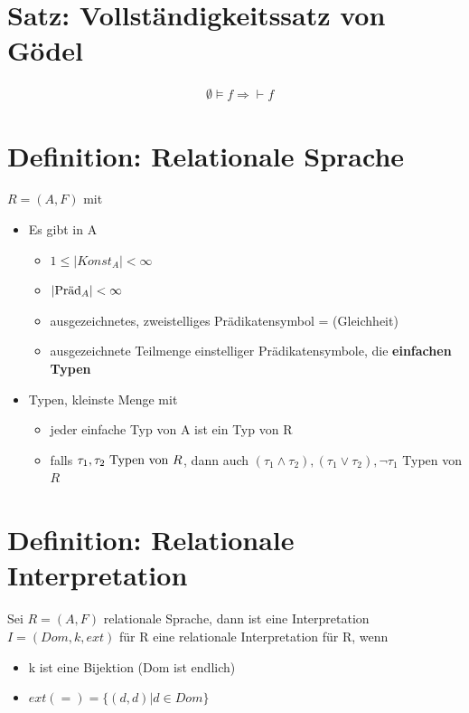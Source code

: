 \documentclass[12pt, a4paper]{article}
\begin{document}
\section*{Satz: Vollständigkeitssatz von Gödel}
\begin{align*}
&\emptyset \models f \Longrightarrow \vdash f
\end{align*}

\section*{Definition: Relationale Sprache}
$R = (A,F)$ mit 
\begin{itemize}
	\item Es gibt in A
	\begin{itemize}
		\item $1 \le |Konst_A| < \infty$
		\item $|\textnormal{Präd}_A| < \infty$
		\item ausgezeichnetes, zweistelliges Prädikatensymbol = (Gleichheit)
		\item ausgezeichnete Teilmenge einstelliger Prädikatensymbole, die \textbf{einfachen Typen}
	\end{itemize}
	\item Typen, kleinste Menge mit 
	\begin{itemize}
		\item jeder einfache Typ  von A ist ein Typ von R
		\item falls $\tau_1, \tau_2 \textnormal{ Typen von } R$, dann auch $(\tau_1 \wedge \tau_2), (\tau_1 \vee \tau_2), \lnot \tau_1$ Typen von $R$
	\end{itemize}
\end{itemize}

\section*{Definition: Relationale Interpretation}
Sei $R = (A, F)$ relationale Sprache, dann ist eine Interpretation $I = (Dom, k, ext)$ für R eine relationale Interpretation für R, wenn
\begin{itemize}
	\item k ist eine Bijektion (Dom ist endlich)
	\item $ext(=) = \{ (d,d) | d \in Dom \}$
\end{itemize}
\end{document}
